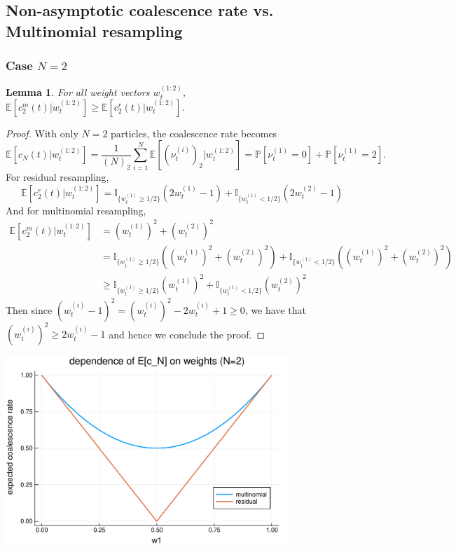 \documentclass[fleqn]{article}
\newtheorem{lemma}{Lemma}
\theoremstyle{definition}
\newcommand{\Prob}{\mathbb{P}}
\newcommand{\E}{\mathbb{E}}
\newcommand{\I}[1]{\mathbb{I}_{\{#1\}}}
\newcommand{\vt}[2][t]{\nu_{#1}^{(#2)}}
\newcommand{\wt}[2][t]{w_{#1}^{(#2)}}
\begin{document}
\subsection{Non-asymptotic coalescence rate vs. Multinomial resampling}

\subsubsection{Case $N=2$}
\begin{lemma}
For all weight vectors $\wt{1:2}$, 
$\E[c_2^m(t) |\wt{1:2}] \geq \E[c_2^r(t) |\wt{1:2}]$.
\end{lemma}

\begin{proof}
With only $N=2$ particles, the coalescence rate becomes
\begin{equation*}
\E[c_N(t) |\wt{1:2}] = \frac{1}{(N)_2} \sum_{i=1}^{N} \E\left[ (\vt{i})_2 |\wt{1:2} \right] 
= \Prob[\vt{1} = 0] + \Prob[\vt{1} = 2].
\end{equation*}
For residual resampling,
\begin{equation*}
\E[c_2^r(t) |\wt{1:2}] = \I{\wt{1} \geq 1/2} (2\wt{1} -1) + \I{\wt{1} < 1/2} (2\wt{2} -1)
\end{equation*}
And for multinomial resampling,
\begin{align*}
\E[c_2^m(t) |\wt{1:2}] &= (\wt{1})^2 + (\wt{2})^2 \\
&= \I{\wt{1} \geq 1/2} ((\wt{1})^2 + (\wt{2})^2) + \I{\wt{1} < 1/2} ((\wt{1})^2 + (\wt{2})^2) \\
&\geq  \I{\wt{1} \geq 1/2} (\wt{1})^2 + \I{\wt{1} < 1/2} (\wt{2})^2
\end{align*}
Then since $(\wt{i} -1)^2 = (\wt{i})^2 -2\wt{i} +1 \geq 0$, we have that $(\wt{i})^2 \geq 2\wt{i} -1$ and hence we conclude the proof.
\end{proof}

\begin{center}
\includegraphics[width=0.8\textwidth]{../residual_resampling/plots/EcN_mn_res_N2.pdf}
\end{center}
\end{document}
